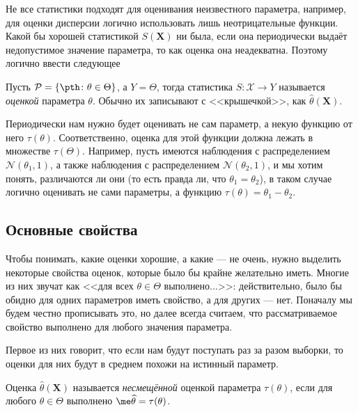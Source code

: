 Не все статистики подходят для оценивания неизвестного параметра, например, для оценки дисперсии логично использовать лишь неотрицательные функции. Какой бы хорошей статистикой $S(\mathbf X)$ ни была, если она периодически выдаёт недопустимое значение параметра, то как оценка она неадекватна. Поэтому логично ввести следующее

\begin{definition}
Пусть $\mathcal{P} = \{\pth\colon \theta \in \Theta\}$, а $Y = \Theta$, тогда статистика $S\colon \mathcal{X} \to Y$ называется \textit{оценкой} параметра $\theta$. Обычно их записывают с <<крышечкой>>, как $\widehat{\theta}(\mathbf X)$.
\end{definition}

Периодически нам нужно будет оценивать не сам параметр, а некую функцию от него $\tau(\theta)$. Соответственно, оценка для этой функции должна лежать в множестве $\tau(\Theta)$. Например, пусть имеются наблюдения с распределением $\mathcal{N}(\theta_1, 1)$, а также наблюдения с распределением $\mathcal{N}(\theta_2, 1)$, и мы хотим понять, различаются ли они (то есть правда ли, что $\theta_1 = \theta_2$), в таком случае логично оценивать не сами параметры, а функцию $\tau(\theta) = \theta_1 - \theta_2$.

\subsection{Основные свойства}

Чтобы понимать, какие оценки хорошие, а какие --- не очень, нужно выделить некоторые свойства оценок, которые было бы крайне желательно иметь. Многие из них звучат как <<для всех $\theta \in \Theta$ выполнено...>>: действительно, было бы обидно для одних параметров иметь свойство, а для других --- нет. Поначалу мы будем честно прописывать это, но далее всегда считаем, что рассматриваемое свойство выполнено для любого значения параметра.

Первое из них говорит, что если нам будут поступать раз за разом выборки, то оценки для них будут в среднем похожи на истинный параметр.

\begin{definition}
Оценка $\widehat{\theta}(\mathbf X)$ называется \textit{несмещённой} оценкой параметра $\tau(\theta)$, если для любого $\theta \in \Theta$ выполнено $\me \widehat{\theta} = \tau(\theta)$.
\end{definition}

